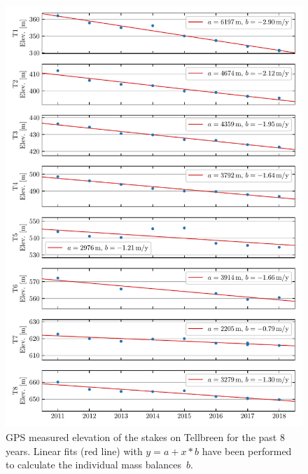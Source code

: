 \begin{figure}[h]
    \centering
    \includegraphics[width=\textwidth]{./figs/Elevation_Tellbreen.pdf}
    \caption{GPS measured elevation of the stakes on Tellbreen for the past 8 years.
    Linear fits (red line) with $y = a + x*b$ have been performed to calculate the individual mass balances~$b$.}
    \label{GPS:fig:elev_tel}
\end{figure}

\begin{table}[h]
	\caption{Results of the elevation fits from Fig.~\ref{GPS:fig:elev_ble} and
	mean values of the elevation measurements for all stakes on Blekumbreen.
    The data in the table is plotted in Fig.~\ref{GPS:fig:elev_ble_mbg}.}
	\centering
	
	\label{GPS:tab:mbal_ble}
\end{table}

\begin{table}[h]
	\caption{Results of the elevation fits from Fig.~\ref{GPS:fig:elev_tel} and
	mean values of the elevation measurements for all stakes on Tellbreen.
    The data in the table is plotted in Fig.~\ref{GPS:fig:elev_tel_mbg}.}
	\centering
	
	\label{GPS:tab:mbal_tel}
\end{table}

